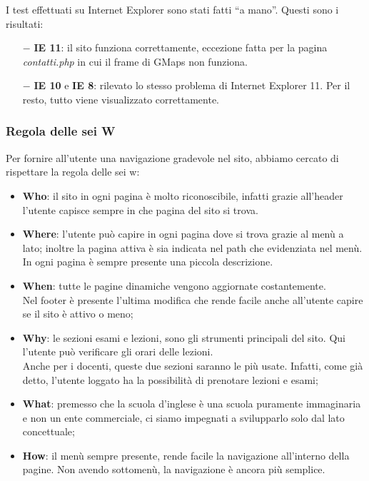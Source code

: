 \documentclass[12pt, a4paper]{article}
\begin{document}
I test effettuati su Internet Explorer sono stati fatti “a mano”. Questi sono i risultati:
\begin{itemize}
	\item[$-$] \textbf{IE 11}: il sito funziona correttamente, eccezione fatta per la 
	pagina \emph{contatti.php} in cui il frame di GMaps non funziona.
	\item[$-$] \textbf{IE 10} e \textbf{IE 8}: rilevato lo stesso problema di Internet Explorer 11. Per il resto, tutto viene visualizzato  correttamente. 
\end{itemize}

\subsubsection{Regola delle sei W}
Per fornire all’utente una navigazione gradevole nel sito, abbiamo cercato di rispettare 
la regola delle sei w:
\begin{itemize}
	\item \textbf{Who}: il sito in ogni pagina è molto riconoscibile, infatti grazie
	all’header l’utente capisce sempre in che pagina del sito si trova.
	\item \textbf{Where}: %
	l’utente può capire in ogni pagina dove si trova grazie al menù a lato; inoltre la pagina attiva è sia indicata nel path che evidenziata nel menù. \\
	In ogni pagina è sempre presente una piccola descrizione.
	\item \textbf{When}: tutte le pagine dinamiche vengono aggiornate costantemente. \\
	Nel footer è presente l’ultima modifica che rende facile anche all’utente capire se il
	 sito è attivo o meno;
	\item \textbf{Why}: le sezioni esami e lezioni, sono gli strumenti principali del sito.
	Qui l’utente può verificare gli orari delle lezioni. \\
	Anche per i docenti, queste due
	sezioni saranno le più usate. Infatti, come già detto, l'utente loggato ha la possibilità
	di prenotare lezioni e esami;
	\item \textbf{What}: premesso che la scuola d’inglese è una scuola puramente immaginaria 
	e non un ente commerciale, ci siamo impegnati a svilupparlo solo dal lato concettuale;
	\item \textbf{How}: il menù sempre presente, rende facile la navigazione all’interno
	della pagine. Non avendo sottomenù, la navigazione è ancora più semplice.
\end{itemize}
\end{document}
